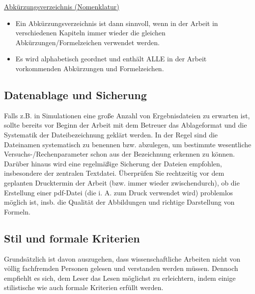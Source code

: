 \vspace{5mm}

\underline{Abkürzungsverzeichnis (Nomenklatur)}

\begin{itemize}
    \item Ein Abkürzungsverzeichnis ist dann sinnvoll, wenn in der Arbeit in verschiedenen Kapiteln immer wieder die gleichen Abkürzungen/Formelzeichen verwendet werden.
    \item Es wird alphabetisch geordnet und enthält ALLE in der Arbeit vorkommenden Abkürzungen und Formelzeichen.
\end{itemize}



\subsection{Datenablage und Sicherung}

Falls z.B. in Simulationen eine große Anzahl von Ergebnisdateien zu erwarten ist, sollte bereits vor Beginn der Arbeit mit dem Betreuer das Ablageformat und die Systematik der Dateibezeichnung geklärt werden. In der Regel sind die Dateinamen systematisch zu benennen bzw. abzulegen, um bestimmte wesentliche Versuchs-/Rechenparameter schon aus der Bezeichnung erkennen zu können. Darüber hinaus wird eine regelmäßige Sicherung der Dateien empfohlen, insbesondere der zentralen Textdatei. Überprüfen Sie rechtzeitig vor dem geplanten Drucktermin der Arbeit (bzw. immer wieder zwischendurch), ob die Erstellung einer pdf-Datei (die i. A. zum Druck verwendet wird) problemlos möglich ist, insb. die Qualität der Abbildungen und richtige Darstellung von Formeln.

\newpage

\subsection{Stil und formale Kriterien}
\label{sec:stil und formale kriterien}

Grundsätzlich ist davon auszugehen, dass  wissenschaftliche Arbeiten nicht von völlig fachfremden Personen gelesen und verstanden werden müssen. Dennoch empfiehlt es sich, dem Leser das Lesen möglichst zu erleichtern, indem einige stilistische wie auch formale Kriterien erfüllt werden.

